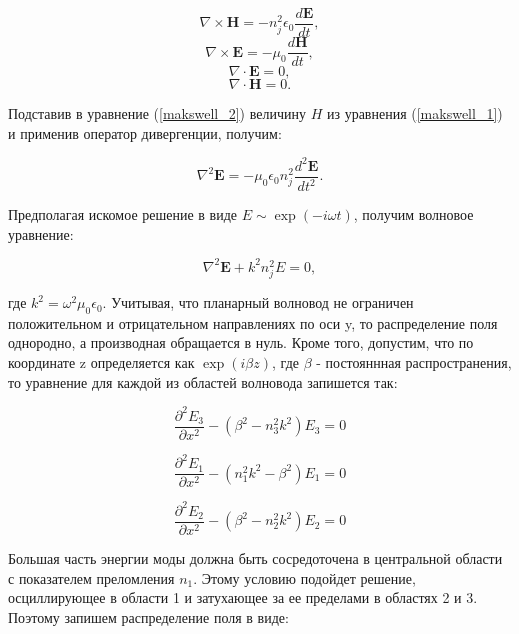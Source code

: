 \begin{equation}
 	\nabla\times \mathbf{H} = -n_j^2\epsilon_0 \frac{d\mathbf{E}}{dt},
 	\label{makswell_1}
\end{equation}
\begin{equation}
	\nabla\times \mathbf{E} = -\mu_0\frac{d\mathbf{H}}{dt},
  	\label{makswell_2}
\end{equation}
\begin{equation}
 	\nabla\cdot \mathbf{E} = 0,
 	\label{makswell_3}
\end{equation}
\begin{equation}
 	\nabla\cdot \mathbf{H} = 0.
 	\label{makswell_4} 
\end{equation}

Подставив в уравнение (\ref{makswell_2}) величину $H$ из уравнения (\ref{makswell_1}) и применив оператор дивергенции, получим:

\begin{equation}
	\nabla^2\mathbf{E} = -\mu_0\epsilon_0 n_j^2 \frac{d^2\mathbf{E}}{dt^2}.
\end{equation}

Предполагая искомое решение в виде $E \sim \exp(-i\omega t)$, получим волновое уравнение:

\begin{equation}
	\nabla^2\mathbf{E} + k^2 n_j^2 E = 0,
\end{equation}

где $k^2 = \omega^2\mu_0 \epsilon_0$. Учитывая, что планарный волновод не ограничен положительном и отрицательном направлениях по оси y, то распределение поля однородно, а производная обращается в нуль. Кроме того, допустим, что по координате z определяется как $\exp(i\beta z)$, где $\beta$ - постояннная распространения, то уравнение для каждой из областей волновода запишется так:

\begin{equation}
	\frac{\partial^2 E_3}{\partial x^2} -(\beta^2 - n_3^2 k^2)E_3 = 0
\end{equation}

\begin{equation}
	\frac{\partial^2 E_1}{\partial x^2} -(n_1^2 k^2 - \beta^2)E_1 = 0
\end{equation}

\begin{equation}
	\frac{\partial^2 E_2}{\partial x^2} -(\beta^2 - n_2^2 k^2)E_2 = 0
\end{equation}

Большая часть энергии моды должна быть сосредоточена в центральной области с показателем преломления $n_1$. Этому условию подойдет решение, осциллирующее в области 1 и затухающее за ее пределами в областях 2 и 3. Поэтому запишем распределение поля в виде:

